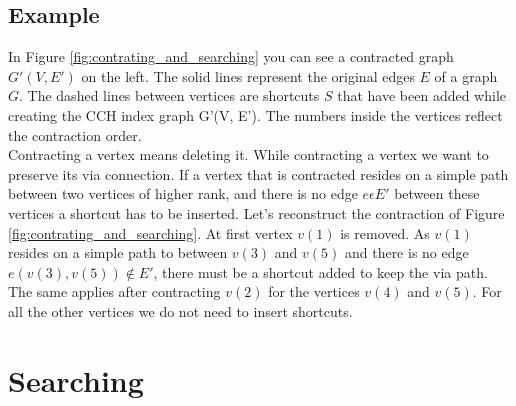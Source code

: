 \subsection{Example}

In Figure \ref{fig:contrating_and_searching} you can see a contracted graph $G'(V,E')$ on the left. The solid lines represent the original edges $E$ of a graph $G$. The dashed lines between vertices are shortcuts $S$ that 
have been added while creating the CCH index graph G'(V, E'). The numbers inside the vertices reflect the contraction order.
\\
Contracting a vertex means deleting it. While contracting a vertex we want to preserve its via connection. If a vertex that is contracted resides on a simple path between two vertices of higher rank,
and there is no edge $e \epsilon E'$ between these vertices a shortcut has to be inserted. 
Let's reconstruct the contraction of Figure \ref{fig:contrating_and_searching}. At first vertex $v(1)$ is removed. As $v(1)$ resides on a simple path to between $v(3)$ and $v(5)$ and there is no edge $e(v(3), v(5)) \notin E'$,
there must be a shortcut added to keep the via path.
The same applies after contracting $v(2)$ for the vertices $v(4)$ and $v(5)$. For all the other vertices we do not need to insert shortcuts.

\section{Searching}



